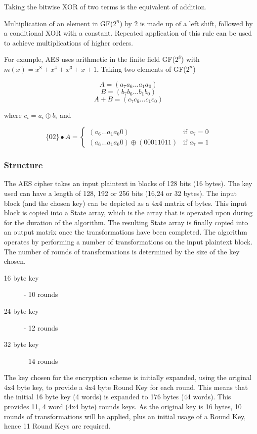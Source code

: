\documentclass[a4paper,10pt]{report}
\begin{document}
Taking the bitwise XOR of two terms is the equivalent of addition. 

Multiplication of an element in GF($2^{n}$) by 2 is made up of a left shift, followed by a conditional XOR with a constant. Repeated application of this rule can be used to achieve multiplications of higher orders.

For example, AES uses arithmetic in the finite field GF($2^{8}$) with $m(x) = x^{8} + x^{4} + x^{3} + x + 1$. Taking two elements of GF($2^{n}$)

\[ A = (a_{7}a_{6}...a_{1}a_{0}) \]
\[ B = (b_{7}b_{6}...b_{1}b_{0}) \]
\[ A + B = (c_{7}c_{6}...c_{1}c_{0})\]

where $c_{i} = a_{i} \oplus b_{i}$ and

\[
    \{02\} \bullet A = 
\begin{cases}
    (a_{6}...a_{1}a_{0}0) & \text{if } a_{7} = 0\\
    (a_{6}...a_{1}a_{0}0) \oplus (00011011) & \text{if } a_{7} = 1
\end{cases}
\]

\subsubsection{Structure}

The AES cipher takes an input plaintext in blocks of 128 bits (16 bytes). The key used can have a length of 128, 192 or 256 bits (16,24 or 32 bytes). The input block (and the chosen key) can be depicted as a 4x4 matrix of bytes. This input block is copied into a State array, which is the array that is operated upon during for the duration of the algorithm. The resulting State array is finally copied into an output matrix once the transformations have been completed. The algorithm operates by performing a number of transformations on the input plaintext block. The number of rounds of transformations is determined by the size of the key chosen. 

\begin{description}
 \item[16 byte key] - 10 rounds
 \item[24 byte key] - 12 rounds
 \item[32 byte key] - 14 rounds
\end{description}

The key chosen for the encryption scheme is initially expanded, using the original 4x4 byte key, to provide a 4x4 byte Round Key for each round. This means that the initial 16 byte key (4 words) is expanded to 176 bytes (44 words). This provides 11, 4 word (4x4 byte) rounds keys. As the original key is 16 bytes, 10 rounds of transformations will be applied, plus an initial usage of a Round Key, hence 11 Round Keys are required.
\end{document}
